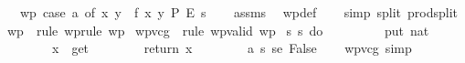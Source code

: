 \begin{isabellebody}
\ \ \ {\isachardoublequoteopen}wp\ {\isacharparenleft}{\kern0pt}case\ a\ of\ {\isacharparenleft}{\kern0pt}x{\isacharcomma}{\kern0pt}\ y{\isacharparenright}{\kern0pt}\ {\isasymRightarrow}\ f\ x\ y{\isacharparenright}{\kern0pt}\ P\ E\ s{\isachardoublequoteclose}\isanewline
%
\isadelimproof
\ \ %
\endisadelimproof
%
\isatagproof
{}\isamarkupfalse%
\ assms\ \isamarkupfalse%
\ wp{\isacharunderscore}{\kern0pt}def\isanewline
\ \ \isamarkupfalse%
\ {\isacharparenleft}{\kern0pt}simp\ split{\isacharcolon}{\kern0pt}\ prod{\isachardot}{\kern0pt}split{\isacharparenright}{\kern0pt}%
\endisatagproof
{\isafoldproof}%
%
\isadelimproof
\isanewline
%
\endisadelimproof
\isanewline
{}\isamarkupfalse%
\ wp\ {\isacharequal}{\kern0pt}\ rule\ wprule{\isacharsemicolon}{\kern0pt}\ wp{\isacharquery}{\kern0pt}\isanewline
{}\isamarkupfalse%
\ wpvcg\ {\isacharequal}{\kern0pt}\ rule\ wp{\isacharunderscore}{\kern0pt}valid{\isacharcomma}{\kern0pt}\ wp\isanewline
\isanewline
{}\isamarkupfalse%
\ {\isachardoublequoteopen}{\isasymlbrace}{\isasymlambda}s{\isachardot}{\kern0pt}\ s{\isacharequal}{\kern0pt}{}{\isasymrbrace}\ do\ {\isacharbraceleft}{\kern0pt}\isanewline
\ \ \ \ \ \ \ \ put\ {\isacharparenleft}{\kern0pt}{}{\isacharcolon}{\kern0pt}{\isacharcolon}{\kern0pt}nat{\isacharparenright}{\kern0pt}{\isacharsemicolon}{\kern0pt}\isanewline
\ \ \ \ \ \ \ \ x\ {\isasymleftarrow}\ get{\isacharsemicolon}{\kern0pt}\isanewline
\ \ \ \ \ \ \ \ return\ x\isanewline
\ \ \ \ \ \ \ {\isacharbraceright}{\kern0pt}\ {\isasymlbrace}{\isasymlambda}a\ s{\isachardot}{\kern0pt}\ s{\isacharequal}{\kern0pt}{}{\isasymrbrace}{\isacharcomma}{\kern0pt}{\isasymlbrace}{\isasymlambda}e{\isachardot}{\kern0pt}\ False{\isasymrbrace}{\isachardoublequoteclose}\isanewline
%
\isadelimproof
\ \ %
\endisadelimproof
%
\isatagproof
{}\isamarkupfalse%
\ {\isacharparenleft}{\kern0pt}wpvcg{\isacharcomma}{\kern0pt}\ simp{\isacharparenright}{\kern0pt}%
\endisatagproof
{\isafoldproof}%
%
\isadelimproof
\isanewline
%
\endisadelimproof
%
\isadelimtheory
%
\endisadelimtheory
%
\isatagtheory
{}\isamarkupfalse%
%
\endisatagtheory
{\isafoldtheory}%
%
\isadelimtheory
%
\endisadelimtheory
%
\end{isabellebody}%
\endinput
